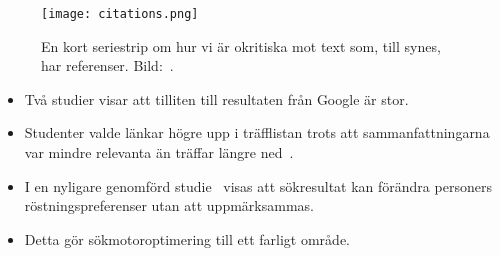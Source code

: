 \documentclass{beamer}
\begin{document}
\begin{frame}{\insertsubsectionhead}
  \begin{figure}
    \texttt{[image: citations.png]}
    \caption{En kort seriestrip om hur vi är okritiska mot text som, till 
    synes, har referenser.
    Bild:~\cite{xkcd906}.}
  \end{figure}
\end{frame}

\begin{frame}{\insertsubsectionhead}
  \begin{itemize}
    \item Två studier visar att tilliten till resultaten från Google är stor.

    \item Studenter valde länkar högre upp i träfflistan trots att 
      sammanfattningarna var mindre relevanta än träffar längre 
      ned~\cite{Pan2007igw}.

    \item I en nyligare genomförd studie~\cite{Epstein2013dar} visas att 
      sökresultat kan förändra personers röstningspreferenser utan att 
      uppmärksammas.

    \item Detta gör sökmotoroptimering till ett farligt område.

  \end{itemize}
\end{frame}
\end{document}
